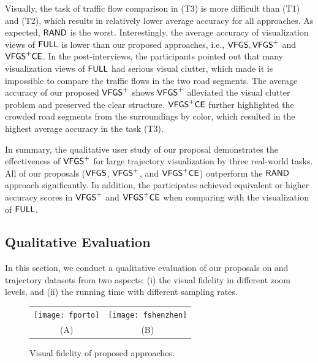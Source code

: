 

Visually, the task of traffic flow comparison in (T3) is more difficult than (T1) and (T2), which results in relatively lower average accuracy for all approaches.
As expected, $\mathsf{RAND}$ is the worst.
Interestingly, the average accuracy of visualization views of $\mathsf{FULL}$ is lower than our proposed approaches, i.e., $\mathsf{VFGS},\mathsf{VFGS}^{+}$ and $\mathsf{VFGS}^{+}\mathsf{CE}$.
In the post-interviews, the participants pointed out that many visualization views of $\mathsf{FULL}$ had serious visual clutter,
which made it is impossible to compare the traffic flows in the two road segments.
The average accuracy of our proposed $\mathsf{VFGS}^{+}$ shows $\mathsf{VFGS}^{+}$ alleviated the visual clutter problem and preserved the clear structure.
$\mathsf{VFGS}^{+}\mathsf{CE}$ further highlighted the crowded road segments from the surroundings by color, which {resulted in} the highest average accuracy in the task (T3).

In summary, the qualitative user study of our proposal demonstrates the effectiveness of $\mathsf{VFGS}^{+}$ for large trajectory visualization by three real-world tasks.
All of our proposals ($\mathsf{VFGS}$, $\mathsf{VFGS}^{+}$, and $\mathsf{VFGS}^{+}\mathsf{CE}$) outperform the $\mathsf{RAND}$ approach significantly.
In addition, the participates achieved equivalent or higher accuracy scores in $\mathsf{VFGS}^{+}$ and $\mathsf{VFGS}^{+}\mathsf{CE}$ when comparing with the visualization of $\mathsf{FULL}$.

\subsection{Qualitative Evaluation}\label{sec:quality}
In this section, we conduct a qualitative evaluation of our proposals on \pt{} and \sz{} trajectory datasets from two aspects: (i) the visual fidelity in different zoom levels,
and (ii) the running time with different sampling rates.

\begin{figure}
 \centering
 \small
 \begin{tabular}{cc}
   \texttt{[image: fporto]}
   &
   \texttt{[image: fshenzhen]}
   \\
   (A) \pt{}
   &
   (B) \sz{}
 \end{tabular}
 \vspace{-3mm}
 \caption{Visual fidelity of proposed approaches.}
 \label{fig:fidelity}
 \vspace{-4mm}
\end{figure}

